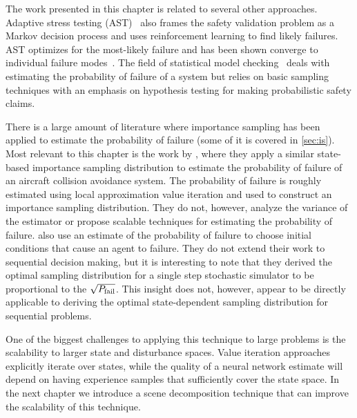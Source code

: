 The work presented in this chapter is related to several other approaches. Adaptive stress testing (AST)~\cite{lee2015adaptive,koren2018adaptive,corso2019adaptive,koren2019efficient} also frames the safety validation problem as a Markov decision process and uses reinforcement learning to find likely failures. AST optimizes for the most-likely failure and has been shown converge to individual failure modes~\cite{corso2019adaptive}. The field of statistical model checking~\cite{agha2018survey} deals with estimating the probability of failure of a system but relies on basic sampling techniques with an emphasis on hypothesis testing for making probabilistic safety claims.

There is a large amount of literature where importance sampling has been applied to estimate the probability of failure (some of it is covered in \cref{sec:is}). Most relevant to this chapter is the work by \textcite{Chryssanthacopoulos2010}, where they apply a similar state-based importance sampling distribution to estimate the probability of failure of an aircraft collision avoidance system. The probability of failure is roughly estimated using local approximation value iteration and used to construct an importance sampling distribution. They do not, however, analyze the variance of the estimator or propose scalable techniques for estimating the probability of failure.  \textcite{uesato2019rigorous} also use an estimate of the probability of failure to choose initial conditions that cause an agent to failure. They do not extend their work to sequential decision making, but it is interesting to note that they derived the optimal sampling distribution for a single step stochastic simulator to be proportional to the $\sqrt{P_{\rm fail}}$. This insight does not, however, appear to be directly applicable to deriving the optimal state-dependent sampling distribution for sequential problems.

One of the biggest challenges to applying this technique to large problems is the scalability to larger state and disturbance spaces. Value iteration approaches explicitly iterate over states, while the quality of a neural network estimate will depend on having experience samples that sufficiently cover the state space. In the next chapter we introduce a scene decomposition technique that can improve the scalability of this technique. 